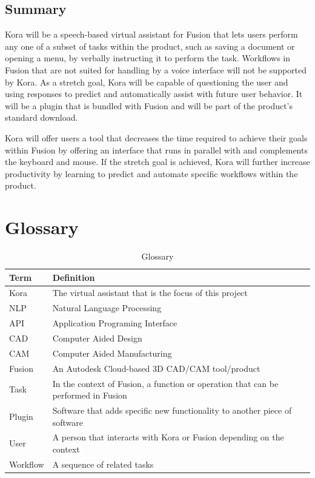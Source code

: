 \documentclass[onecolumn, draftclsnofoot,10pt, compsoc]{IEEEtran}
\begin{document}
	
	\subsection{Summary}
		Kora will be a speech-based virtual assistant for Fusion that lets users perform any one of a subset of tasks within the product, such as saving a document or opening a menu, by verbally instructing it to perform the task.
		Workflows in Fusion that are not suited for handling by a voice interface will not be supported by Kora.
		As a stretch goal, Kora will be capable of questioning the user and using responses to predict and automatically assist with future user behavior.
		It will be a plugin that is bundled with Fusion and will be part of the product's standard download. 
		
		Kora will offer users a tool that decreases the time required to achieve their goals within Fusion by offering an interface that runs in parallel with and complements the keyboard and mouse.
		If the stretch goal is achieved, Kora will further increase productivity by learning to predict and automate specific workflows within the product.

\section{Glossary}
	\begin{table}[H]
		\centering
		\caption{Glossary}
		\label{my-label}
		\begin{tabular}{|l|l|}
			\hline
			\textbf{Term} & \textbf{Definition} \\ \hline
			Kora & The virtual assistant that is the focus of this project \\ \hline
			NLP & Natural Language Processing \\ \hline
			API & Application Programing Interface \\ \hline
			CAD & Computer Aided Design \\ \hline
			CAM & Computer Aided Manufacturing \\ \hline
			Fusion & An Autodesk Cloud-based 3D CAD/CAM tool/product \\ \hline
			Task & In the context of Fusion, a function or operation that can be performed in Fusion \\ \hline
			Plugin & Software that adds specific new functionality to another piece of software \\ \hline
			User & A person that interacts with Kora or Fusion depending on the context \\ \hline
			Workflow & A sequence of related tasks \\ \hline
		\end{tabular}
	\end{table}
\end{document}
